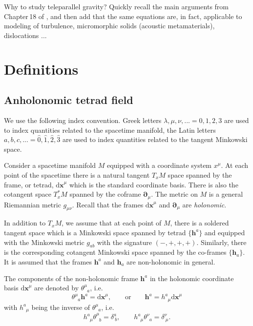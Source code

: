 \documentclass[
10pt, %
a4paper, %
oneside, %
headinclude,footinclude, %
BCOR5mm, %
]{scrartcl}
\newcommand{\pdd}[1]{{\bm{\partial}_{#1}}}
\newcommand{\dx}[1]{{\bm{\mathrm{d}x}^{#1}}}
\newcommand{\bas}[1]{\bm{h}^{#1}}
\newcommand{\cobas}[1]{\bm{h}_{#1}}
\newcommand{\tetrsymbol}{h}
\newcommand{\itetrsymbol}{\theta}
\newcommand{\itetr}[2]{\itetrsymbol^{#1}_{\phantom{#1}#2}}
\newcommand{\tetr}[2]{\tetrsymbol^{#1}_{\phantom{#1}#2}}
\begin{document}
Why to study teleparallel gravity? Quickly recall the main arguments from Chapter\,18 of 
\cite{AldrovandiPereiraBook}, and then add that the same equations are, in fact, applicable to 
modeling of 
turbulence, micromorphic solids (acoustic metamaterials), dislocations 
\cite{Torsion2019}... 

\section{Definitions}

\subsection{Anholonomic tetrad field}

We use the following index convention. Greek letters $ \lambda,\mu,\nu,... =0,1,2,3
$ are used to index quantities related to the spacetime manifold, the Latin letters $ a,b,c,... 
=\hat{0},\hat{1},\hat{2},\hat{3}$ are used to index quantities related to the tangent Minkowski 
space.



Consider a spacetime manifold $ M $ equipped with a coordinate system $ x^\mu $. At each point of 
the spacetime there is a natural tangent $ T_{x}M $ space spanned by the frame, or tetrad, $ 
\dx{\mu} $ which is the standard coordinate basis. 
There is also the cotangent space $ T_x^*M $ spanned by the coframe $ \pdd{\mu} $.
The metric on $ M $ is a general Riemannian metric $ g_{\mu\nu} $. 
Recall that the frames $ \dx{\mu} $ and $ \pdd{\mu} $ are \emph{holonomic}.

In addition to $ T_{x}M $, we assume that at each point of $ M $, there is a soldered tangent space 
which is a Minkowski space spanned by tetrad $ \{ \bas{a} \}$ and equipped with the 
Minkowski metric $ g_{ab} $ with the signature $ 
(-,+,+,+) $. Similarly, there is the 
corresponding cotangent Minkowski space spanned by the co-frames $ \{ \cobas{a} \}$. It is assumed 
that the frames $ \bas{a} $ and $ \cobas{a} $ are non-holonomic in general.

The components of the non-holonomic frame $ \bas{a} $ in the holonomic coordinate basis $ \dx{\mu} 
$ are denoted by $ \itetr{\mu}{a} $, i.e. 
\begin{equation}
	\itetr{\mu}{a} \bas{a} = \dx{\mu}, \qquad \text{or} \qquad \bas{a} = \tetr{a}{\mu}\dx{\mu}
\end{equation}
with $ \tetr{a}{\mu} $ being the inverse of $ \itetr{\mu}{a} $, i.e.
\begin{equation}\label{eqn.inv.tetr}
	\tetr{a}{\mu} \itetr{\mu}{b} = \delta^a_{\ b},
	\qquad
	\tetr{a}{\mu} \itetr{\nu}{a} = \delta^\nu_{\ \mu}.
\end{equation}
\end{document}
